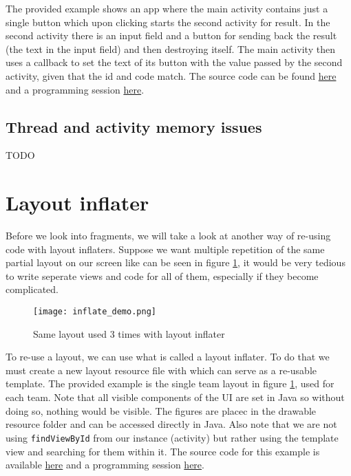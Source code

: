 The provided example shows an app where the main activity contains just a single button which upon clicking starts the second activity for result. In the second activity there is an input field and a button for sending back the result (the text in the input field) and then destroying itself. The main activity then uses a callback to set the text of its button with the value passed by the second activity, given that the id and code match. The source code can be found \href{https://github.com/JonSteinn/AndroidDevelopment/tree/master/examples/lab3/activityforresult}{here} and a programming session \href{TODO}{here}.

\subsection{Thread and activity memory issues}
TODO

\section{Layout inflater}
Before we look into fragments, we will take a look at another way of re-using code with layout inflaters. Suppose we want multiple repetition of the same partial layout on our screen like can be seen in figure \ref{fig:infldem}, it would be very tedious to write seperate views and code for all of them, especially if they become complicated.

\begin{figure}[H]
\centering
\texttt{[image: inflate\_demo.png]}
\caption{Same layout used 3 times with layout inflater}
\label{fig:infldem}
\end{figure}

To re-use a layout, we can use what is called a layout inflater. To do that we must create a new layout resource file with  which can serve as a re-usable template. The provided example is the single team layout in figure \ref{fig:infldem}, used for each team. Note that all visible components of the UI are set in Java so without doing so, nothing would be visible. The figures are placec in the drawable resource folder and can be accessed directly in Java. Also note that we are not using \texttt{findViewById} from our instance (activity) but rather using the template view and searching for them within it. The source code for this example is available \href{https://github.com/JonSteinn/AndroidDevelopment/tree/master/examples/lab3/inflator}{here} and a programming session \href{TODO}{here}.

